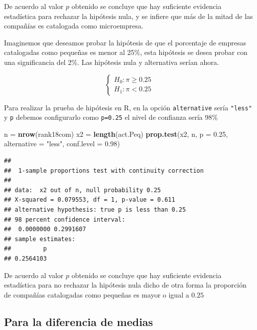 \documentclass[letterpaper,]{book}
\newenvironment{Shaded}{\begin{snugshade}}{\end{snugshade}}
\newcommand{\DataTypeTok}[1]{\textcolor[rgb]{0.13,0.29,0.53}{#1}}
\newcommand{\FloatTok}[1]{\textcolor[rgb]{0.00,0.00,0.81}{#1}}
\newcommand{\KeywordTok}[1]{\textcolor[rgb]{0.13,0.29,0.53}{\textbf{#1}}}
\newcommand{\NormalTok}[1]{#1}
\newcommand{\StringTok}[1]{\textcolor[rgb]{0.31,0.60,0.02}{#1}}
\begin{document}
De acuerdo al valor \(p\) obtenido se concluye que hay suficiente evidencia estadística para rechazar la hipótesis nula, y se infiere que más de la mitad de las compañías es catalogada como microempresa.

Imaginemos que deseamos probar la hipótesis de que el porcentaje de empresas catalogadas como pequeñas es menor al 25\%, esta hipótesis se desea probar con una significancia del 2\%. Las hipótesis nula y alternativa serían ahora.

\begin{equation} 
\begin{cases} 
H_0: \pi \geq 0.25 \\ 
H_1: \pi < 0.25
\end{cases} 
\end{equation}

Para realizar la prueba de hipótesis en R, en la opción \texttt{alternative} sería \texttt{"less"} y \texttt{p} debemos configurarlo como \texttt{p=0.25} el nivel de confianza sería 98\%

\begin{Shaded}
\begin{Highlighting}[]
\NormalTok{n =}\StringTok{ }\KeywordTok{nrow}\NormalTok{(rank18com)}
\NormalTok{x2 =}\StringTok{ }\KeywordTok{length}\NormalTok{(act.Peq)}
\KeywordTok{prop.test}\NormalTok{(x2, n, }\DataTypeTok{p =} \FloatTok{0.25}\NormalTok{, }\DataTypeTok{alternative =} \StringTok{"less"}\NormalTok{,  }\DataTypeTok{conf.level =} \FloatTok{0.98}\NormalTok{)}
\end{Highlighting}
\end{Shaded}

\begin{verbatim}
## 
##  1-sample proportions test with continuity correction
## 
## data:  x2 out of n, null probability 0.25
## X-squared = 0.079553, df = 1, p-value = 0.611
## alternative hypothesis: true p is less than 0.25
## 98 percent confidence interval:
##  0.0000000 0.2991607
## sample estimates:
##         p 
## 0.2564103
\end{verbatim}

De acuerdo al valor \(p\) obtenido se concluye que hay suficiente evidencia estadística para no rechazar la hipótesis nula dicho de otra forma la proporción de compañías catalogadas como pequeñas es mayor o igual a \(0.25\)

\hypertarget{para-la-diferencia-de-medias}{%
\subsection{Para la diferencia de medias}\label{para-la-diferencia-de-medias}}
\end{document}
